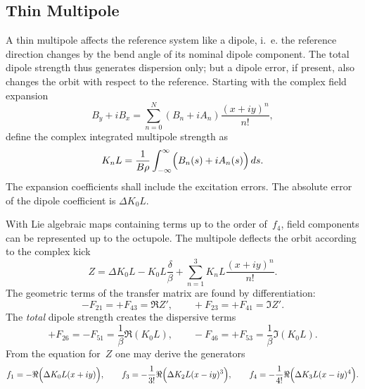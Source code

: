 \subsection{Thin Multipole}
A thin multipole affects the reference system like a dipole,
i.~e. the reference direction changes by the bend angle of its
nominal dipole component.
The total dipole strength thus generates dispersion only;
but a dipole error, if present, also changes the orbit with respect to
the reference.
Starting with the complex field expansion
\[
B_y + i B_x = \sum_{n=0}^N (B_n + i A_n)\frac{(x + i y)^n}{n!},
\]
define the complex integrated multipole strength as
\[
K_nL=\frac{1}{B\rho}\int_{-\infty}^{\infty}\Bigl(B_n(s)+i A_n(s)\Bigr)\,ds.
\]
The expansion coefficients shall include the excitation errors.
The absolute error of the dipole coefficient is $\Delta K_0 L$.

With Lie algebraic maps containing terms up to the order of~$f_4$,
field components can be represented up to the octupole.
The multipole deflects the orbit according to the complex kick
\[
Z = \Delta K_0 L - K_0 L \frac{\delta}{\beta}
  + \sum_{n=1}^3 K_n L \frac{(x + i y)^n}{n!}.
\]
The geometric terms of the transfer matrix are found by differentiation:
\[
-F_{21}=+F_{43}=\Re Z', \qquad +F_{23}=+F_{41}=\Im Z'.
\]
The {\em total} dipole strength creates the dispersive terms
\[
+F_{26}=-F_{51}=\frac{1}{\beta}\Re(K_0 L), \qquad
-F_{46}=+F_{53}=\frac{1}{\beta}\Im(K_0 L).
\]
From the equation for~$Z$ one may derive the generators
\[
f_1=-\Re\Bigl(\Delta K_0 L (x + iy) \Bigr), \qquad
f_3=-\frac{1}{3!}\Re\Bigl(\Delta K_2 L (x - iy)^3 \Bigr), \qquad
f_4=-\frac{1}{4!}\Re\Bigl(\Delta K_3 L (x - iy)^4 \Bigr).
\]

